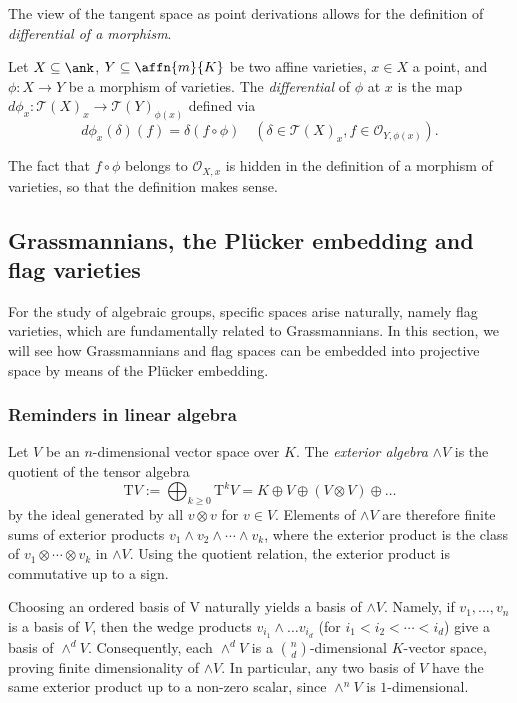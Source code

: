 The view of the tangent space as point derivations allows for the definition of \emph{differential of a morphism}. 

\begin{defn}
    Let $X \subseteq \ank$, $Y \subseteq \affn{m}{K}$ be two affine varieties, $x \in X$ a point, and $\phi : X \rightarrow Y$ be a morphism of varieties. The \emph{differential} of $\phi$ at $x$ is the map $d \phi_x : \mathcal{T}{(X)}_x \to \mathcal{T}{(Y)}_{\phi(x)}$ defined via
    \[ d\phi_x(\delta)(f) = \delta\left(f \circ \phi\right) \quad \left(\delta \in \mathcal{T}{(X)}_x, f \in \mathcal{O}_{Y,\phi(x)}\right).\]
\end{defn}

The fact that $f \circ \phi$ belongs to $\mathcal{O}_{X,x}$ is hidden in the definition of a morphism of varieties, so that the definition makes sense.

\subsection{Grassmannians, the Plücker embedding and flag varieties}
For the study of algebraic groups, specific spaces arise naturally, namely flag varieties, which are fundamentally related to Grassmannians. In this section, we will see how Grassmannians and flag spaces can be embedded into projective space by means of the Plücker embedding.

\subsubsection{Reminders in linear algebra}

Let $V$ be an $n$-dimensional vector space over $K$. The \emph{exterior algebra} $\wedge V$ is the quotient of the tensor algebra
\[ \text{T}V := \bigoplus_{k \geq 0} \text{T}^k V = K \oplus V \oplus (V\otimes V) \oplus \ldots \]
by the ideal generated by all $v \otimes v$ for $v \in V$. Elements of $\wedge V$ are therefore finite sums of exterior products $v_1 \wedge v_2 \wedge \cdots \wedge v_k$, where the exterior product is the class of $v_1 \otimes \cdots \otimes v_k$ in $\wedge V$. Using the quotient relation, the exterior product is commutative up to a sign. 

Choosing an ordered basis of V naturally yields a basis of $\wedge V$. Namely, if $v_1, \ldots, v_n$ is a basis of $V$, then the wedge products $v_{i_1} \wedge \ldots v_{i_d}$ (for $i_1 < i_2 < \cdots < i_d$) give a basis of $\wedge^d V$. Consequently, each $\wedge^d V$ is a $\binom{n}{d}$-dimensional $K$-vector space, proving finite dimensionality of $\wedge V$. In particular, any two basis of $V$ have the same exterior product up to a non-zero scalar, since $\wedge^n V$ is $1$-dimensional. 

